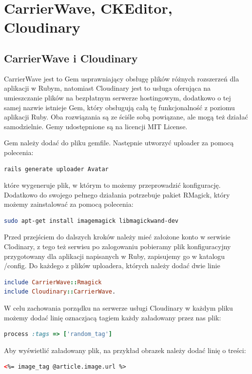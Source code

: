 \documentclass[openright]{xmgr}
\begin{document}
\newpage

\section{CarrierWave, CKEditor, Cloudinary}
\subsection{CarrierWave i Cloudinary}
CarrierWave jest to Gem usprawniający obsługę plików różnych rozszerzeń dla aplikacji w Rubym, natomiast Cloudinary jest to usługa oferująca na umieszczanie plików na bezpłatnym serwerze hostingowym, dodatkowo o tej samej nazwie istnieje Gem, który obsługują całą tę funkcjonalność z poziomu aplikacji Ruby. Oba rozwiązania są ze ściśle sobą powiązane, ale mogą też działać samodzielnie. Gemy udostępnione są na licencji MIT License. 

Gem należy dodać do pliku gemfile. Następnie utworzyć uploader za pomocą polecenia: 
\begin{lstlisting}[language=bash]
rails generate uploader Avatar
\end{lstlisting}
które wygeneruje plik, w którym to możemy przeprowadzić konfigurację. Dodatkowo do swojego pełnego działania potrzebuje pakiet RMagick, który możemy zainstalować za pomocą polecenia: 
\begin{lstlisting}[language=bash]
sudo apt-get install imagemagick libmagickwand-dev
\end{lstlisting}
Przed przejściem do dalszych kroków należy mieć założone konto w serwisie Clodinary, z tego też serwisu po zalogowaniu pobieramy plik konfiguracyjny przygotowany dla aplikacji napisanych w Ruby, zapisujemy go w katalogu /config. Do każdego z plików uploadera, których należy dodać dwie linie 
\begin{lstlisting}[language=ruby]
include CarrierWave::Rmagick
include Cloudinary::CarrierWave.
\end{lstlisting}
W celu zachowania porządku na serwerze usługi Cloudinary w każdym pliku możemy dodać linię oznaczjacą tagiem każdy załadowany przez nas plik: 
\begin{lstlisting}[language=ruby]
process :tags => ['random_tag']
\end{lstlisting}
Aby wyświetlić załadowany plik, na przykład obrazek należy dodać linię o treści: 
\begin{lstlisting}[language=html]
<%= image_tag @article.image.url %>
\end{lstlisting}
\end{document}
